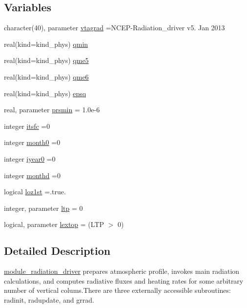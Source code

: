 \subsection*{Variables}
\begin{DoxyCompactItemize}
\item 
character(40), parameter \hyperlink{namespacemodule__radiation__driver_a70a36595385cf1f5794f9c5859e52ab6}{vtagrad} =\textquotesingle{}N\+C\+EP-\/Radiation\+\_\+driver v5. Jan 2013 \textquotesingle{}
\item 
real(kind=kind\+\_\+phys) \hyperlink{namespacemodule__radiation__driver_afdc2a7e1dbfb075ac33a2388564d9428}{qmin}
\item 
real(kind=kind\+\_\+phys) \hyperlink{namespacemodule__radiation__driver_ab671cb80142c71dab5f41f01ccdcc088}{qme5}
\item 
real(kind=kind\+\_\+phys) \hyperlink{namespacemodule__radiation__driver_a4916e37c472b2f824b6f566ff67200cd}{qme6}
\item 
real(kind=kind\+\_\+phys) \hyperlink{namespacemodule__radiation__driver_a0b0bf0fa8723b80d0891ec3327d187d7}{epsq}
\item 
real, parameter \hyperlink{namespacemodule__radiation__driver_a3fc43ca0d2c5f69a380ddb4f0926ecc7}{prsmin} = 1.\+0e-\/6
\item 
integer \hyperlink{namespacemodule__radiation__driver_a9ee6a89464bf206cc07ea30d7eeaaeb8}{itsfc} =0
\item 
integer \hyperlink{namespacemodule__radiation__driver_a6eb268f296c77047f389ed6fac5f95be}{month0} =0
\item 
integer \hyperlink{namespacemodule__radiation__driver_a4d755de48d0aa83f337a2a907ac7d8a2}{iyear0} =0
\item 
integer \hyperlink{namespacemodule__radiation__driver_ac4baf8ff048aaa5b85d03cc42c579c7b}{monthd} =0
\item 
logical \hyperlink{namespacemodule__radiation__driver_af6e0e1ef2ebb78f57c897ebaf633edd2}{loz1st} =.true.
\item 
integer, parameter \hyperlink{namespacemodule__radiation__driver_aab2535e9906afd709124056f4ca1e470}{ltp} = 0
\item 
logical, parameter \hyperlink{namespacemodule__radiation__driver_ad27b36d0186c8147fe839eb5c268d157}{lextop} = (L\+TP $>$ 0)
\end{DoxyCompactItemize}


\subsection{Detailed Description}
\hyperlink{namespacemodule__radiation__driver}{module\+\_\+radiation\+\_\+driver} prepares atmospheric profile, invokes main radiation calculations, and computes radiative fluxes and heating rates for some arbitrary number of vertical colums.\+There are three externally accessible subroutines\+: radinit, radupdate, and grrad. 

